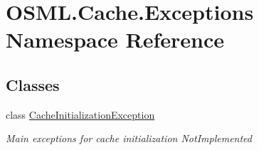 \hypertarget{namespaceOSML_1_1Cache_1_1Exceptions}{}\section{O\+S\+M\+L.\+Cache.\+Exceptions Namespace Reference}
\label{namespaceOSML_1_1Cache_1_1Exceptions}
\subsection*{Classes}
\begin{DoxyCompactItemize}
\item 
class \mbox{\hyperlink{classOSML_1_1Cache_1_1Exceptions_1_1CacheInitializationException}{Cache\+Initialization\+Exception}}
\begin{DoxyCompactList}\small\item\em Main exceptions for cache initialization Not\+Implemented \end{DoxyCompactList}\end{DoxyCompactItemize}
